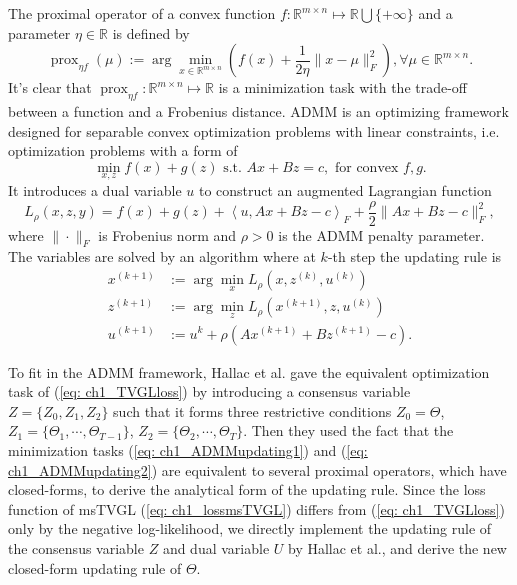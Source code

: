 The proximal operator\cite{Parikh2014Proximal} of a convex function $f:\mathbb{R}^{m\times n}\mapsto\mathbb{R}\bigcup\{+\infty\}$ and a parameter $\eta\in\mathbb{R}$ is defined by 
\begin{equation*}
    \operatorname{prox}_{\eta f}(\mu):= \arg\min_{x\in\mathbb{R}^{m\times n}}(f(x)+\frac{1}{2\eta}\|x-\mu\|^2_F), \forall \mu\in\mathbb{R}^{m\times n}.
\end{equation*}
It's clear that $\operatorname{prox}_{\eta f}:\mathbb{R}^{m\times n}\mapsto\mathbb{R}$ is a minimization task with the trade-off between a function and a Frobenius distance. 
ADMM is an optimizing framework designed for separable convex optimization problems with linear constraints\cite{Boyd2011distributed}, 
i.e. optimization problems with a form of 
\begin{equation*}
    \min_{x,z} f(x)+g(z) \text{ s.t. } Ax+Bz=c, \text{ for convex }f,g.
\end{equation*}
It introduces a dual variable $u$ to construct an augmented Lagrangian function
\begin{equation*}
    L_{\rho}(x,z,y)=f(x)+g(z)+\left\langle u,Ax+Bz-c\right\rangle_{F}+\frac{\rho}{2}\|Ax+Bz-c\|_F^2, 
\end{equation*}
where $\|\cdot\|_F$ is Frobenius norm and $\rho>0$ is the ADMM penalty parameter. 
The variables are solved by an algorithm where at $k$-th step the updating rule is
\begin{align}
    x^{(k+1)} &:= \arg\min_x L_{\rho}(x,z^{(k)},u^{(k)}) \label{eq: ch1_ADMMupdating1} \\
    z^{(k+1)} &:= \arg\min_z L_{\rho}(x^{(k+1)},z,u^{(k)}) \label{eq: ch1_ADMMupdating2} \\
    u^{(k+1)} &:= u^k + \rho(Ax^{(k+1)}+Bz^{(k+1)}-c). \label{eq: ch1_ADMMupdating3}
\end{align}

To fit in the ADMM framework, Hallac et al. gave the equivalent optimization task of (\ref{eq: ch1_TVGLloss}) by 
introducing a consensus variable $Z=\{Z_0,Z_1,Z_2\}$ such that it forms three restrictive conditions $Z_0=\Theta$, 
$Z_1=\{\Theta_1,\cdots,\Theta_{T-1}\}$, $Z_2=\{\Theta_2,\cdots,\Theta_T\}$. 
Then they used the fact that the minimization tasks (\ref{eq: ch1_ADMMupdating1}) and (\ref{eq: ch1_ADMMupdating2}) are equivalent to several proximal operators, 
which have closed-forms, to derive the analytical form of the updating rule.
Since the loss function of msTVGL (\ref{eq: ch1_lossmsTVGL}) differs from (\ref{eq: ch1_TVGLloss}) only by the negative log-likelihood, 
we directly implement the updating rule of the consensus variable $Z$ and dual variable $U$ by Hallac et al., 
and derive the new closed-form updating rule of $\Theta$.

